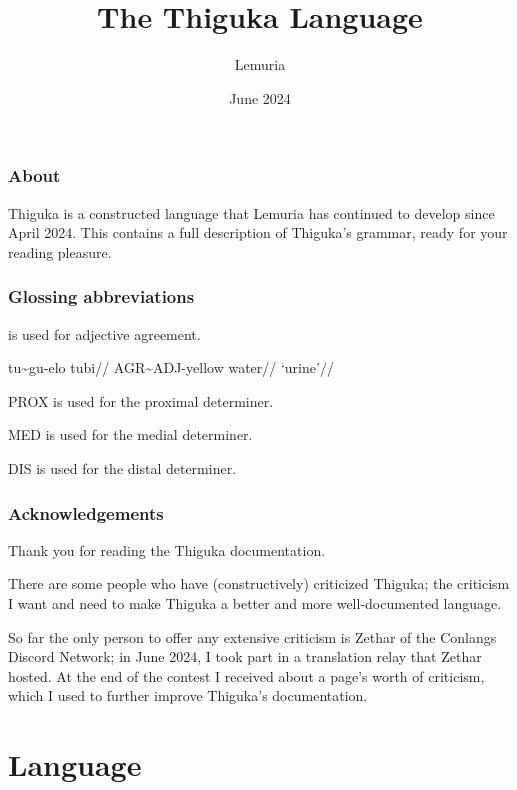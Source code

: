 \documentclass{thigukabook}
\title{The Thiguka Language}
\date{June 2024}
\author{Lemuria}
\begin{document}
\maketitle

\newpage

\thigukacopyright{}


\section*{About}
Thiguka is a constructed language that Lemuria has continued to develop since April 2024.
This contains a full description of Thiguka's grammar, ready for your reading pleasure.

\section*{Glossing abbreviations}
\agradj is used for adjective agreement.

\ex
\begingl
    \gla  tu\~{}{}gu-elo tubi//
    \glb  AGR\~{}ADJ-yellow water//
    \glft `urine'//
\endgl
\xe

PROX is used for the proximal determiner.

MED is used for the medial determiner.

DIS is used for the distal determiner.

\section*{Acknowledgements}
Thank you for reading the Thiguka documentation.

There are some people who have (constructively) criticized Thiguka; the criticism I want and need to make Thiguka a better and more well-documented language.

So far the only person to offer any extensive criticism is Zethar of the Conlangs Discord Network; in June 2024, I took part in a translation relay that Zethar hosted.
At the end of the contest I received about a page's worth of criticism, which I used to further improve Thiguka's documentation.

\tableofcontents

\part{Language}







\end{document}
